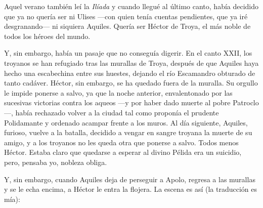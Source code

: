 %

Aquel verano también leí la \emph{Ilíada} y cuando llegué al último canto, había decidido que ya no quería ser ni Ulises ---con quien tenía cuentas pendientes, que ya iré desgranando--- ni siquiera Aquiles. Quería ser Héctor de Troya, el más noble de todos los héroes del mundo.

Y, sin embargo, había un pasaje que no conseguía digerir. En el canto XXII, los troyanos se han refugiado tras las murallas de Troya, después de que Aquiles haya hecho una escabechina entre sus huestes, dejando el río Escamandro obturado de tanto cadáver. Héctor, sin embargo, se ha quedado fuera de la muralla. Su orgullo le impide ponerse a salvo, ya que la noche anterior, envalentonado por las sucesivas victorias contra los aqueos ---y por haber dado muerte al pobre Patroclo---, había rechazado volver a la ciudad tal como proponía el prudente Polidamante y ordenado acampar frente a los muros. Al día siguiente, Aquiles, furioso, vuelve a la batalla, decidido a vengar en sangre troyana la muerte de su amigo, y a los troyanos no les queda otra que ponerse a salvo. Todos menos Héctor. Estaba claro que quedarse a esperar al divino Pélida era un suicidio, pero, pensaba yo, nobleza obliga.

Y, sin embargo, cuando Aquiles deja de perseguir a Apolo, regresa a las murallas y se le echa encima, a Héctor le entra la flojera. La escena es así (la traducción es mía):

